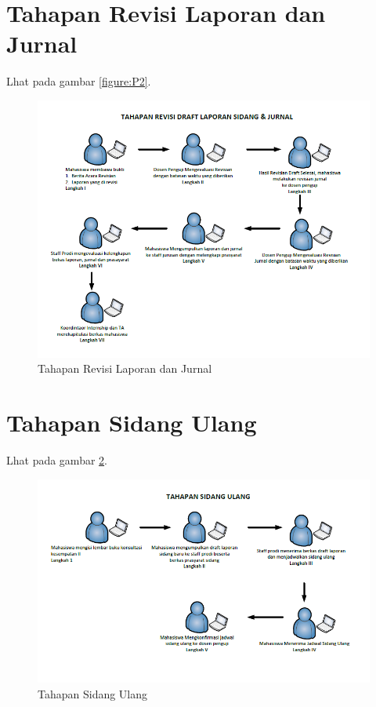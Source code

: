 \section{Tahapan Revisi Laporan dan Jurnal}
Lhat pada gambar \ref{figure:P2}.
\begin{figure}[ht]
	\centerline{\includegraphics[width=1\textwidth]{figures/revisi.png}}
	\caption{Tahapan Revisi Laporan dan Jurnal}
	\label{figure:P3}
	\end{figure}
\section{Tahapan Sidang Ulang}
Lhat pada gambar \ref{figure:P4}.
\begin{figure}[ht]
	\centerline{\includegraphics[width=1\textwidth]{figures/ulang.png}}
	\caption{Tahapan Sidang Ulang}
	\label{figure:P4}
	\end{figure}
